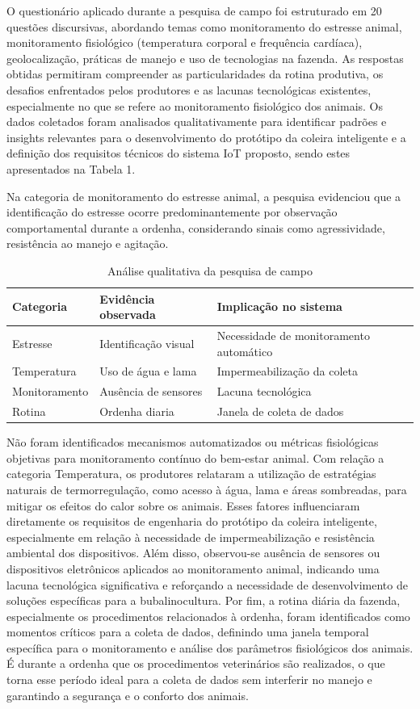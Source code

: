 \documentclass[11pt,a4paper]{article}
\begin{document}
O questionário aplicado durante a pesquisa de campo foi estruturado em 20 questões discursivas, abordando temas como monitoramento do estresse animal, monitoramento fisiológico
(temperatura corporal e frequência cardíaca), geolocalização, práticas de manejo e uso de tecnologias na fazenda. As respostas obtidas permitiram compreender as particularidades da rotina
produtiva, os desafios enfrentados pelos produtores e as lacunas tecnológicas existentes, especialmente no que se refere ao monitoramento fisiológico dos animais. Os dados coletados foram
analisados qualitativamente para identificar padrões e insights relevantes para o desenvolvimento
do protótipo da coleira inteligente e a definição dos requisitos técnicos do sistema IoT proposto,
sendo estes apresentados na Tabela 1.

Na categoria de monitoramento do estresse animal, a pesquisa evidenciou que a identificação
do estresse ocorre predominantemente por observação comportamental durante a ordenha, considerando sinais como agressividade, resistência ao manejo e agitação. 


\begin{table}[htbp]
\centering
\caption{Análise qualitativa da pesquisa de campo}
\label{tab:analise_qualitativa}
\begin{tabular}{|l|l|l|}
\hline
\textbf{Categoria} & \textbf{Evidência observada} & \textbf{Implicação no sistema} \\ \hline
Estresse & Identificação visual & Necessidade de monitoramento automático \\ \hline
Temperatura & Uso de água e lama & Impermeabilização da coleta \\ \hline
Monitoramento & Ausência de sensores & Lacuna tecnológica \\ \hline
Rotina & Ordenha diaria & Janela de coleta de dados \\ \hline
\end{tabular}
\end{table}

Não foram identificados mecanismos automatizados ou métricas fisiológicas objetivas para monitoramento contínuo do
bem-estar animal. Com relação a categoria Temperatura, os produtores relataram a utilização
de estratégias naturais de termorregulação, como acesso à água, lama e áreas sombreadas, para
mitigar os efeitos do calor sobre os animais. Esses fatores influenciaram diretamente os requisitos de engenharia do protótipo da coleira inteligente, especialmente em relação à necessidade de
impermeabilização e resistência ambiental dos dispositivos. Além disso, observou-se ausência de
sensores ou dispositivos eletrônicos aplicados ao monitoramento animal, indicando uma lacuna
tecnológica significativa e reforçando a necessidade de desenvolvimento de soluções específicas
para a bubalinocultura. Por fim, a rotina diária da fazenda, especialmente os procedimentos
relacionados à ordenha, foram identificados como momentos críticos para a coleta de dados, definindo uma janela temporal específica para o monitoramento e análise dos parâmetros fisiológicos
dos animais. É durante a ordenha que os procedimentos veterinários são realizados, o que torna
esse período ideal para a coleta de dados sem interferir no manejo e garantindo a segurança e o
conforto dos animais.
\end{document}
